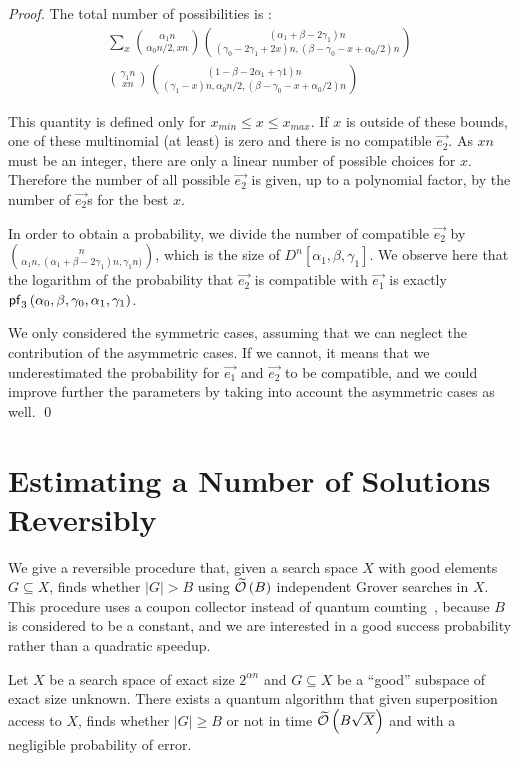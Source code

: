 \begin{proof}
The total number of possibilities is :
\begin{multline*}
\sum\limits_x {\alpha_1 n \choose \alpha_0 n/2, x n} {(\alpha_1+\beta-2\gamma_1) n \choose (\gamma_0-2\gamma_1+2x) n, (\beta-\gamma_0-x+\alpha_0/2) n} \\ {\gamma_1 n \choose x n} {(1-\beta-2\alpha_1+\gamma1) n \choose (\gamma_1-x) n, \alpha_0 n/2, (\beta-\gamma_0-x+\alpha_0/2)n}
\end{multline*}

This quantity is defined only for $x_{min} \leqslant x \leqslant x_{max}$. If $x$ is outside of these bounds, one of these multinomial (at least) is zero and there is no compatible $\vec{e_2}$. As $x n$ must be an integer, there are only a linear number of possible choices for $x$. Therefore the number of all possible $\vec{e_2}$ is given, up to a polynomial factor, by the number of $\vec{e_2}$s for the best $x$.

In order to obtain a probability, we divide the number of compatible $\vec{e_2}$ by $n \choose \alpha_1 n, (\alpha_1 + \beta - 2\gamma_1)n, \gamma_1 n)$, which is the size of $D^n[\alpha_1, \beta, \gamma_1]$. We observe here that the logarithm of the probability that $\vec{e_2}$ is compatible with $\vec{e_1}$ is exactly $\mathsf{pf}_3 \left(\alpha_0, \beta, \gamma_0, \alpha_1, \gamma_1 \right)$.

We only considered the symmetric cases, assuming that we can neglect the contribution of the asymmetric cases. If we cannot, it means that we underestimated the probability for $\vec{e_1}$ and $\vec{e_2}$ to be compatible, and we could improve further the parameters by taking into account the asymmetric cases as well. \qed
\end{proof}



\section{Estimating a Number of Solutions Reversibly}\label{appendix:nbsols}

We give a reversible procedure that, given a search space $X$ with good elements $G \subseteq X$, finds whether $|G| >  B$ using $\widetilde{\mathcal{O}} \left(B \right)$ independent Grover searches in $X$. This procedure uses a coupon collector instead of quantum counting~\cite{DBLP:conf/icalp/BrassardHT98}, because $B$ is considered to be a constant, and we are interested in a good success probability rather than a quadratic speedup.

\begin{lemma}
Let $X$ be a search space of exact size $2^{\alpha n}$ and $G \subseteq X$ be a ``good'' subspace of exact size unknown. There exists a quantum algorithm that given superposition access to $X$, finds whether $|G| \geq B$ or not in time $\widetilde{\mathcal{O}} \left(B \sqrt{X} \right)$ and with a negligible probability of error.
\end{lemma}

